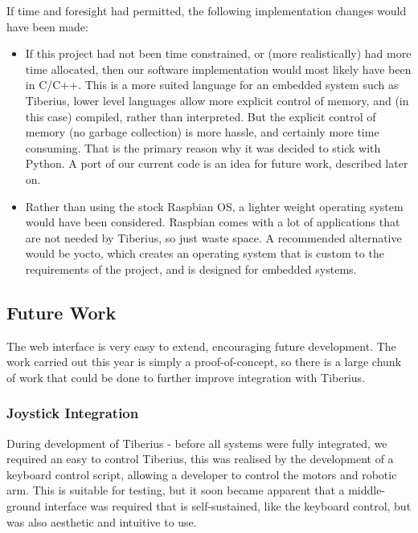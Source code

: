 If time and foresight had permitted, the following implementation changes would have been made:
\begin{itemize}
\item If this project had not been time constrained, or (more realistically) had more time allocated, then our software implementation would most likely have been in C/C++. This is a more suited language for an embedded system such as Tiberius, lower level languages allow more explicit control of memory, and (in this case) compiled, rather than interpreted. But the explicit control of memory (no garbage collection) is more hassle, and certainly more time consuming. That is the primary reason why it was decided to stick with Python. A port of our current code is an idea for future work, described later on.

\item Rather than using the stock Raspbian OS, a lighter weight operating system would have been considered. Raspbian comes with a lot of applications that are not needed by Tiberius, so just waste space. A recommended alternative would be \gls{yocto}, which creates an  operating system that is custom to the requirements of the project, and is designed for embedded systems.

\end{itemize}

\subsection{Future Work}
\label{sec:web_future_work}

The web interface is very easy to extend, encouraging future development.
The work carried out this year is simply a proof-of-concept, so there is a large
chunk of work that could be done to further improve integration with Tiberius.

\subsubsection{Joystick Integration}
During development of Tiberius - before all systems were fully integrated, we required an easy
to control Tiberius, this was realised by the development of a keyboard control script, allowing a developer to control the motors and robotic arm. This is suitable for testing, but it soon became apparent that a middle-ground interface was required that is self-sustained, like the keyboard control, but was also aesthetic and intuitive to use.

